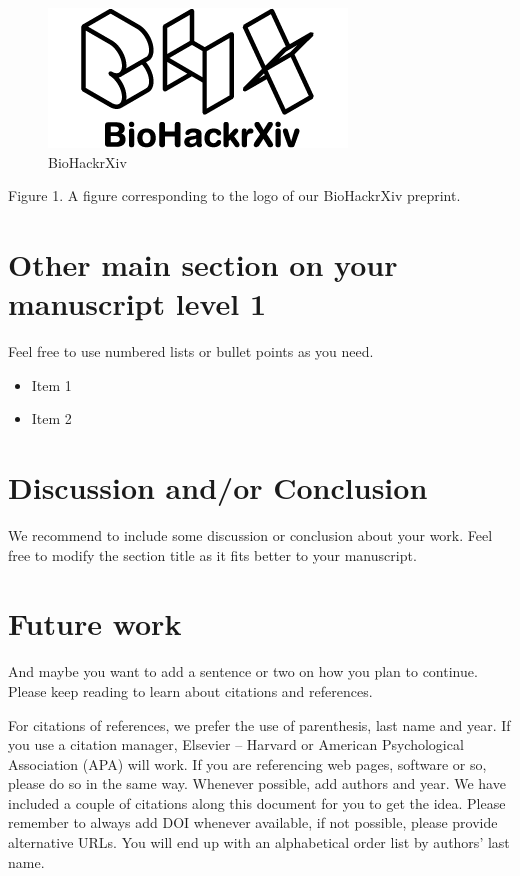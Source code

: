 \documentclass[a4paper,10pt]{article}
\begin{document}
\begin{figure}
\centering
\includegraphics{./biohackrxiv.png}
\caption{BioHackrXiv}
\end{figure}

Figure 1. A figure corresponding to the logo of our BioHackrXiv preprint.

\section{Other main section on your manuscript level
1}\label{other-main-section-on-your-manuscript-level-1}

Feel free to use numbered lists or bullet points as you need. 
\begin{itemize}
  \item Item 1
  \item Item 2
\end{itemize}

\section{Discussion and/or
Conclusion}\label{discussion-andor-conclusion}

We recommend to include some discussion or conclusion about your work. Feel free to modify the section title as it fits better to your manuscript.

\section{Future work}\label{future-work}

And maybe you want to add a sentence or two on how you plan to continue. Please keep reading to learn about citations and references.

For citations of references, we prefer the use of parenthesis, last name and year. If you use a citation manager, Elsevier -- Harvard or American Psychological Association (APA) will work. If you are referencing web pages, software or so, please do so in the same way. Whenever possible, add authors and year. We have included a couple of citations along this document for you to get the idea. Please remember to always add DOI whenever available, if not possible, please provide alternative URLs. You will end up with an alphabetical order list by authors' last name.
\end{document}

